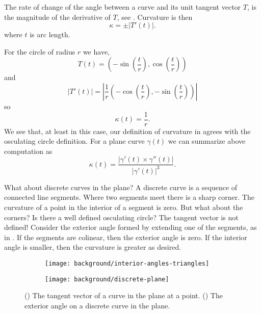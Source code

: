 The rate of change of the angle between a curve and its unit tangent vector $T$, is the magnitude
of the derivative of $T$, see . Curvature is then
\begin{equation} \label{eqn:kappa}
\kappa= \pm | T'(t)|.
\end{equation}
where $t$ is arc length.  


For the circle of radius $r$ we have,
$$T(t)=\left(-\sin\left(\frac{t}{r}\right),\cos\left(\frac{t}{r}\right)\right)$$
and 
$$|T'(t)|=\left|\frac{1}{r}\left(-\cos\left(\frac{t}{r}\right),-\sin\left(\frac{t}{r}\right)\right)\right|$$
so
$$\kappa(t)=\frac{1}{r}.$$
We see that,  at least in this case, our definition of curvature in  agrees with the
osculating circle definition. 
For a plane curve $\gamma(t)$ we can summarize above computation as
\begin{equation} \label{eqn:kappa1}
\kappa(t)=\frac{|\gamma'(t)\times \gamma''(t)|}{|\gamma'(t)|^3}.
\end{equation}

What about discrete curves in the plane? A discrete curve is a sequence of connected
line segments. Where two
segments meet there is a sharp corner. The curvature of a point in the interior of a segment
is zero. But what about the corners? Is there a well defined osculating circle? The tangent
vector is not defined!
Consider the exterior angle formed by extending one of the segments, as in . 
If the segments are colinear, then the exterior angle is zero. If the interior angle
is smaller, then the curvature is greater as desired.




\begin{figure}[htb]
    \captionsetup[subfigure]{justification=centering}
    \centering
    \begin{subfigure}[b]{0.35\textwidth}
        \texttt{[image: background/interior-angles-triangles]}
       \subcaption{}\label{fig:smooth-tangent}
    \end{subfigure}
        \hspace{1cm}
        \begin{subfigure}[b]{0.35\textwidth}
        \texttt{[image: background/discrete-plane]}
        \subcaption{}\label{fig:discrete-plane}
        \end{subfigure}
    \caption{() The tangent vector of a curve in the plane at a point.
        () The exterior angle on a discrete curve in the plane.
    }
    \label{fig:osculating-sphere}
\end{figure}




